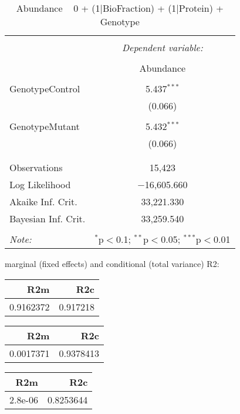 \documentclass[11pt]{report}
\begin{document}
\begin{table}[!htbp] \centering 
  \caption{Abundance ~ 0 + (1|BioFraction) + (1|Protein) + Genotype} 
  \label{} 
\begin{tabular}{@{\extracolsep{5pt}}lc} 
\\[-1.8ex]\hline 
\hline \\[-1.8ex] 
 & \multicolumn{1}{c}{\textit{Dependent variable:}} \\ 
\cline{2-2} 
\\[-1.8ex] & Abundance \\ 
\hline \\[-1.8ex] 
 GenotypeControl & 5.437$^{***}$ \\ 
  & (0.066) \\ 
  & \\ 
 GenotypeMutant & 5.432$^{***}$ \\ 
  & (0.066) \\ 
  & \\ 
\hline \\[-1.8ex] 
Observations & 15,423 \\ 
Log Likelihood & $-$16,605.660 \\ 
Akaike Inf. Crit. & 33,221.330 \\ 
Bayesian Inf. Crit. & 33,259.540 \\ 
\hline 
\hline \\[-1.8ex] 
\textit{Note:}  & \multicolumn{1}{r}{$^{*}$p$<$0.1; $^{**}$p$<$0.05; $^{***}$p$<$0.01} \\ 
\end{tabular} 
\end{table} 
marginal (fixed effects) and conditional (total variance) R2:

\begin{tabular}{r|r}
\hline
R2m & R2c\\
\hline
0.9162372 & 0.917218\\
\hline
\end{tabular}

\begin{tabular}{r|r}
\hline
R2m & R2c\\
\hline
0.0017371 & 0.9378413\\
\hline
\end{tabular}

\begin{tabular}{r|r}
\hline
R2m & R2c\\
\hline
2.8e-06 & 0.8253644\\
\hline
\end{tabular}
\end{document}
